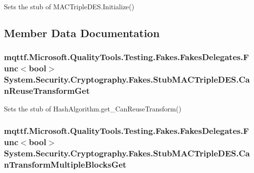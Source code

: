 Sets the stub of M\-A\-C\-Triple\-D\-E\-S.\-Initialize()



\subsection{Member Data Documentation}
\hypertarget{class_system_1_1_security_1_1_cryptography_1_1_fakes_1_1_stub_m_a_c_triple_d_e_s_a7f6001b6b4549b37bf05e9245f0e5384}{
\subsubsection[{Can\-Reuse\-Transform\-Get}]{\setlength{\rightskip}{0pt plus 5cm}mqttf.\-Microsoft.\-Quality\-Tools.\-Testing.\-Fakes.\-Fakes\-Delegates.\-Func$<$bool$>$ System.\-Security.\-Cryptography.\-Fakes.\-Stub\-M\-A\-C\-Triple\-D\-E\-S.\-Can\-Reuse\-Transform\-Get}}\label{class_system_1_1_security_1_1_cryptography_1_1_fakes_1_1_stub_m_a_c_triple_d_e_s_a7f6001b6b4549b37bf05e9245f0e5384}


Sets the stub of Hash\-Algorithm.\-get\-\_\-\-Can\-Reuse\-Transform()

\hypertarget{class_system_1_1_security_1_1_cryptography_1_1_fakes_1_1_stub_m_a_c_triple_d_e_s_ab40277eb2846d1c444954959f479b040}{
\subsubsection[{Can\-Transform\-Multiple\-Blocks\-Get}]{\setlength{\rightskip}{0pt plus 5cm}mqttf.\-Microsoft.\-Quality\-Tools.\-Testing.\-Fakes.\-Fakes\-Delegates.\-Func$<$bool$>$ System.\-Security.\-Cryptography.\-Fakes.\-Stub\-M\-A\-C\-Triple\-D\-E\-S.\-Can\-Transform\-Multiple\-Blocks\-Get}}\label{class_system_1_1_security_1_1_cryptography_1_1_fakes_1_1_stub_m_a_c_triple_d_e_s_ab40277eb2846d1c444954959f479b040}


